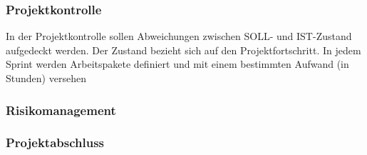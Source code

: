 \subsubsection{Projektkontrolle}
In der Projektkontrolle sollen Abweichungen zwischen SOLL- und IST-Zustand aufgedeckt werden. Der Zustand bezieht sich auf den Projektfortschritt. In jedem Sprint werden Arbeitspakete definiert und mit einem bestimmten Aufwand (in Stunden) versehen
\subsubsection{Risikomanagement}

\subsubsection{Projektabschluss}